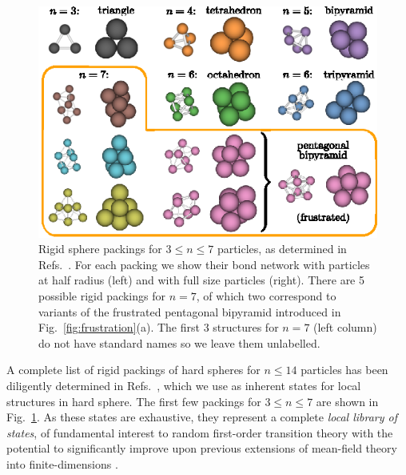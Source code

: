 \documentclass[11pt,twoside]{report}
\begin{document}
\begin{figure}
  \includegraphics[width=\linewidth,outer]{packings}
  \caption[Rigid spherical packings of up to 7 particles]{
    Rigid sphere packings for $3 \le n \le 7$ particles, as determined in Refs.\ \cite{ArkusPRL2009,Holmes-CerfonSR2016}.
    For each packing we show their bond network with particles at half radius (left) and with full size particles (right).
    There are 5 possible rigid packings for $n=7$, of which two correspond to variants of the frustrated pentagonal bipyramid introduced in Fig.\ \ref{fig:frustration}(a).
    The first 3 structures for $n=7$ (left column) do not have standard names so we leave them unlabelled.
  }
  \label{fig:packings}
\end{figure}

A complete list of rigid packings of hard spheres for $n \le 14$ particles has been diligently determined in Refs.\ \cite{ArkusPRL2009,ArkusSJDM2011,Holmes-CerfonSR2016,Holmes-CerfonARCMP2017}, which we use as inherent states for local structures in hard sphere.
The first few packings for $3 \le n \le 7$ are shown in Fig.\ \ref{fig:packings}.
As these states are exhaustive, they represent a complete \emph{local library of states}, of fundamental interest to random first-order transition theory \cite{LubchenkoARPC2007} with the potential to significantly improve upon previous extensions of mean-field theory into finite-dimensions \cite{KirkpatrickPRB1987,HallJCP1987,KirkpatrickPRA1989,BouchaudJCP2004,DzeroPRB2005,FranzJSM2005,AngeliniJSP2017,RulquinJSM2016,BiroliMeanPRB2018,BiroliFinitePRB2018}.
\end{document}
